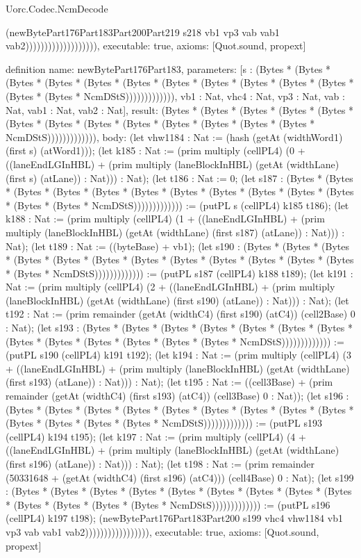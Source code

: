 \begin{lexlean}{Uorc.Codec.NcmDecode}
\begin{semanticmodule}
{(newBytePart176Part183Part200Part219 s218 vb1 vp3 vab vab1 vab2))))))))))))))))))),
  executable: true,
  axioms: [Quot.sound, propext]
}

definition{
  name: newBytePart176Part183,
  parameters: [s : (Bytes * (Bytes * (Bytes * (Bytes * (Bytes * (Bytes * (Bytes * (Bytes * (Bytes * (Bytes * (Bytes * (Bytes * (Bytes * NcmDStS))))))))))))), vb1 : Nat, vhc4 : Nat, vp3 : Nat, vab : Nat, vab1 : Nat, vab2 : Nat],
  result: (Bytes * (Bytes * (Bytes * (Bytes * (Bytes * (Bytes * (Bytes * (Bytes * (Bytes * (Bytes * (Bytes * (Bytes * (Bytes * NcmDStS))))))))))))),
  body: (let vhw1184 : Nat := (hash (getAt (widthWord1) (first s) (atWord1))); (let k185 : Nat := (prim multiply (cellPL4) (0 + ((laneEndLGInHBL) + (prim multiply (laneBlockInHBL) (getAt (widthLane) (first s) (atLane)) : Nat))) : Nat); (let t186 : Nat := 0; (let s187 : (Bytes * (Bytes * (Bytes * (Bytes * (Bytes * (Bytes * (Bytes * (Bytes * (Bytes * (Bytes * (Bytes * (Bytes * (Bytes * NcmDStS))))))))))))) := (putPL s (cellPL4) k185 t186); (let k188 : Nat := (prim multiply (cellPL4) (1 + ((laneEndLGInHBL) + (prim multiply (laneBlockInHBL) (getAt (widthLane) (first s187) (atLane)) : Nat))) : Nat); (let t189 : Nat := ((byteBase) + vb1); (let s190 : (Bytes * (Bytes * (Bytes * (Bytes * (Bytes * (Bytes * (Bytes * (Bytes * (Bytes * (Bytes * (Bytes * (Bytes * (Bytes * NcmDStS))))))))))))) := (putPL s187 (cellPL4) k188 t189); (let k191 : Nat := (prim multiply (cellPL4) (2 + ((laneEndLGInHBL) + (prim multiply (laneBlockInHBL) (getAt (widthLane) (first s190) (atLane)) : Nat))) : Nat); (let t192 : Nat := (prim remainder (getAt (widthC4) (first s190) (atC4)) (cell2Base) 0 : Nat); (let s193 : (Bytes * (Bytes * (Bytes * (Bytes * (Bytes * (Bytes * (Bytes * (Bytes * (Bytes * (Bytes * (Bytes * (Bytes * (Bytes * NcmDStS))))))))))))) := (putPL s190 (cellPL4) k191 t192); (let k194 : Nat := (prim multiply (cellPL4) (3 + ((laneEndLGInHBL) + (prim multiply (laneBlockInHBL) (getAt (widthLane) (first s193) (atLane)) : Nat))) : Nat); (let t195 : Nat := ((cell3Base) + (prim remainder (getAt (widthC4) (first s193) (atC4)) (cell3Base) 0 : Nat)); (let s196 : (Bytes * (Bytes * (Bytes * (Bytes * (Bytes * (Bytes * (Bytes * (Bytes * (Bytes * (Bytes * (Bytes * (Bytes * (Bytes * NcmDStS))))))))))))) := (putPL s193 (cellPL4) k194 t195); (let k197 : Nat := (prim multiply (cellPL4) (4 + ((laneEndLGInHBL) + (prim multiply (laneBlockInHBL) (getAt (widthLane) (first s196) (atLane)) : Nat))) : Nat); (let t198 : Nat := (prim remainder (50331648 + (getAt (widthC4) (first s196) (atC4))) (cell4Base) 0 : Nat); (let s199 : (Bytes * (Bytes * (Bytes * (Bytes * (Bytes * (Bytes * (Bytes * (Bytes * (Bytes * (Bytes * (Bytes * (Bytes * (Bytes * NcmDStS))))))))))))) := (putPL s196 (cellPL4) k197 t198); (newBytePart176Part183Part200 s199 vhc4 vhw1184 vb1 vp3 vab vab1 vab2))))))))))))))))),
  executable: true,
  axioms: [Quot.sound, propext]
}


\end{semanticmodule}
\end{lexlean}
